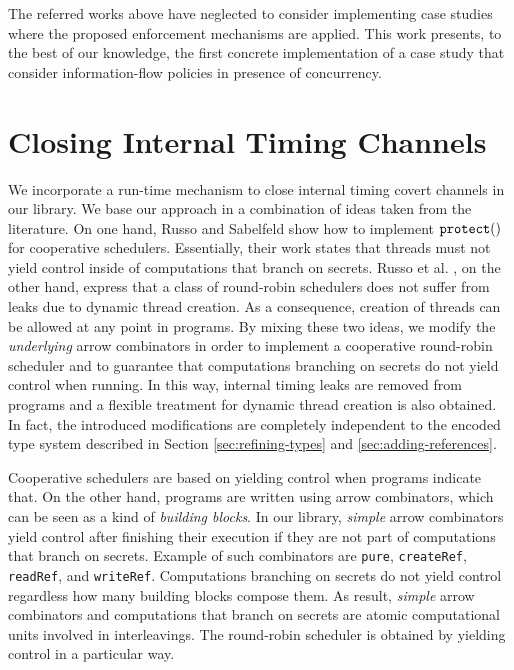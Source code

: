 \documentclass[times, 10pt,twocolumn]{article}
\begin{document}
{The referred works above have neglected to consider implementing 
case studies where the proposed enforcement mechanisms are applied. 
This work presents, 
to the best of our knowledge, the first concrete
implementation of a case study that consider 
information-flow policies in presence of concurrency.

\section{Closing Internal Timing Channels} \label{sec:implementing-concurrency}

We incorporate a run-time mechanism to close internal
timing covert channels in our library. 
We base our approach in a combination of ideas 
taken from the literature.
On one hand, Russo and Sabelfeld \cite{Russo:Sabelfeld:PSI06}
show how to implement $\mathtt{protect}()$ for cooperative schedulers.
Essentially, their work states that threads must not  
yield control inside of computations that branch on secrets. 
Russo et al. \cite{Russo:Hughes:Naumann:Sabelfeld:ASIAN06}, 
on the other hand, express that a class of round-robin schedulers does 
not suffer from leaks due to dynamic thread creation. As a consequence, 
creation of threads can be allowed at any point in programs.
By mixing these two ideas, we modify the \emph{underlying} arrow
combinators in order to implement a cooperative round-robin scheduler 
and to guarantee that computations branching 
on secrets do not yield control when running. 
In this way, internal timing leaks are removed from programs
and a flexible treatment for dynamic thread creation is also 
obtained.  
In fact, the introduced modifications are  
completely independent to the encoded type system described 
in Section \ref{sec:refining-types} and \ref{sec:adding-references}. 



Cooperative schedulers are based on yielding control when 
programs indicate that. On the other hand, programs are written 
using arrow combinators, which can be seen as a kind of \emph{building
  blocks}.  In our library, \emph{simple} arrow combinators  
yield control after finishing their execution if 
they are not part of computations that branch on secrets. 
Example of such combinators are \texttt{pure}, \texttt{createRef}, 
\texttt{readRef}, and \texttt{writeRef}.
Computations branching on secrets do not yield control 
regardless how many building blocks compose them.
As result, \emph{simple} arrow combinators  and computations that branch 
on secrets are atomic computational units involved in
interleavings. The round-robin scheduler is obtained 
by yielding control in a particular way. 


}
\end{document}
